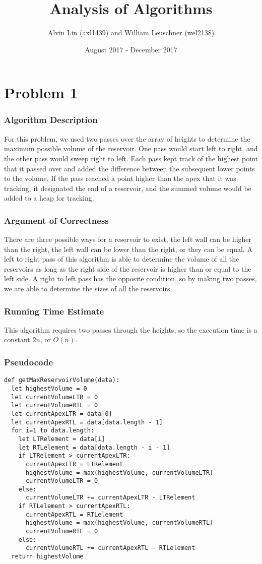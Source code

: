 \documentclass{math}
\title{Analysis of Algorithms}
\author{Alvin Lin (axl1439) and William Leuschner (wel2138)}
\date{August 2017 - December 2017}
\begin{document}
\maketitle

\section*{Problem 1}

\subsubsection*{Algorithm Description}
For this problem, we used two passes over the array of heights to determine
the maximum possible volume of the reservoir. One pass would start left to
right, and the other pass would sweep right to left. Each pass kept track of
the highest point that it passed over and added the difference between the
subsequent lower points to the volume. If the pass reached a point higher than
the apex that it was tracking, it designated the end of a reservoir, and the
summed volume would be added to a heap for tracking.

\subsubsection*{Argument of Correctness}
There are three possible ways for a reservoir to exist, the left wall can be
higher than the right, the left wall can be lower than the right, or they can
be equal. A left to right pass of this algorithm is able to determine the
volume of all the reservoirs as long as the right side of the reservoir is
higher than or equal to the left side. A right to left pass has the opposite
condition, so by making two passes, we are able to determine the sizes of all
the reservoirs.

\subsubsection*{Running Time Estimate}
This algorithm requires two passes through the heights, so the execution time is
a constant \( 2n \), or \( O(n) \).

\subsubsection*{Pseudocode}
\begin{lstlisting}
def getMaxReservoirVolume(data):
  let highestVolume = 0
  let currentVolumeLTR = 0
  let currentVolumeRTL = 0
  let currentApexLTR = data[0]
  let currentApexRTL = data[data.length - 1]
  for i=1 to data.length:
    let LTRelement = data[i]
    let RTLelement = data[data.length - i - 1]
    if LTRelement > currentApexLTR:
      currentApexLTR = LTRelement
      highestVolume = max(highestVolume, currentVolumeLTR)
      currentVolumeLTR = 0
    else:
      currentVolumeLTR += currentApexLTR - LTRelement
    if RTLelement > currentApexRTL:
      currentApexRTL = RTLelement
      highestVolume = max(highestVolume, currentVolumeRTL)
      currentVolumeRTL = 0
    else:
      currentVolumeRTL += currentApexRTL - RTLelement
  return highestVolume
\end{lstlisting}
\end{document}
